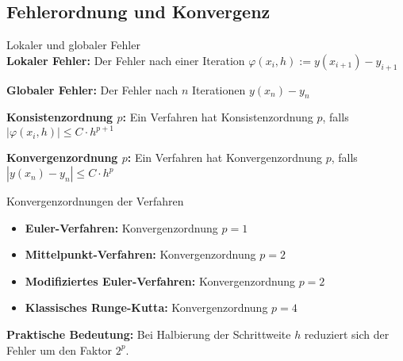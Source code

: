 \subsection{Fehlerordnung und Konvergenz}

\begin{definition}{Lokaler und globaler Fehler}\\
\textbf{Lokaler Fehler:} Der Fehler nach einer Iteration
$\varphi(x_i, h) := y(x_{i+1}) - y_{i+1}$

\textbf{Globaler Fehler:} Der Fehler nach $n$ Iterationen
$y(x_n) - y_n$

\textbf{Konsistenzordnung $p$:} Ein Verfahren hat Konsistenzordnung $p$, falls
$|\varphi(x_i, h)| \leq C \cdot h^{p+1}$

\textbf{Konvergenzordnung $p$:} Ein Verfahren hat Konvergenzordnung $p$, falls
$|y(x_n) - y_n| \leq C \cdot h^p$
\end{definition}

\begin{concept}{Konvergenzordnungen der Verfahren}\\
\begin{itemize}
    \item \textbf{Euler-Verfahren:} Konvergenzordnung $p = 1$
    \item \textbf{Mittelpunkt-Verfahren:} Konvergenzordnung $p = 2$
    \item \textbf{Modifiziertes Euler-Verfahren:} Konvergenzordnung $p = 2$
    \item \textbf{Klassisches Runge-Kutta:} Konvergenzordnung $p = 4$
\end{itemize}

\textbf{Praktische Bedeutung:} Bei Halbierung der Schrittweite $h$ reduziert sich der Fehler um den Faktor $2^p$.
\end{concept}

